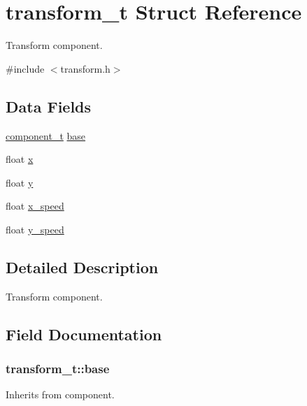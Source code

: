 \hypertarget{structtransform__t}{}\section{transform\+\_\+t Struct Reference}
\label{structtransform__t}


Transform component.  




{\ttfamily \#include $<$transform.\+h$>$}

\subsection*{Data Fields}
\begin{DoxyCompactItemize}
\item 
\hyperlink{structcomponent__t}{component\+\_\+t} \hyperlink{structtransform__t_a6c86baf062cf2fb369f9142c34d917a2}{base}
\item 
float \hyperlink{structtransform__t_ae80f93e0a38c783dbaf2273c04d75aa9}{x}
\item 
float \hyperlink{structtransform__t_ab5c2c657ca08da07220eda12f4a3fa26}{y}
\item 
float \hyperlink{structtransform__t_a3dfafe13ab0fcbf01ad5535f30c13bde}{x\+\_\+speed}
\item 
float \hyperlink{structtransform__t_a749cd7bbef5ec055a35fb3d0e4dcda0c}{y\+\_\+speed}
\end{DoxyCompactItemize}


\subsection{Detailed Description}
Transform component. 

\subsection{Field Documentation}
\subsubsection[{\texorpdfstring{base}{base}}]{ transform\+\_\+t\+::base}\hypertarget{structtransform__t_a6c86baf062cf2fb369f9142c34d917a2}{}\label{structtransform__t_a6c86baf062cf2fb369f9142c34d917a2}
Inherits from component. 
